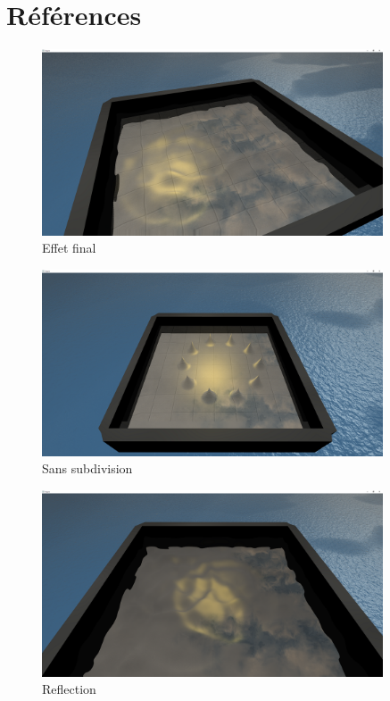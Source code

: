 \documentclass[a4paper, 12pt]{article} %
\begin{document}
\section{Références}
\begin{figure}
	\centering
	\includegraphics[width=0.9\textwidth]{./PhotoRapport/EffetFinal.png}
	\caption{Effet final}
	\label{EffetFinal}
\end{figure}
\begin{figure}
	\centering
	\includegraphics[width=0.9\textwidth]{./PhotoRapport/NoSubdivide.png}
	\caption{Sans subdivision}
	\label{NoSubdivide}
\end{figure}
\begin{figure}
	\centering
	\includegraphics[width=0.9\textwidth]{./PhotoRapport/Reflection.png}
	\caption{Reflection}
	\label{Reflection}
\end{figure}
\end{document}
